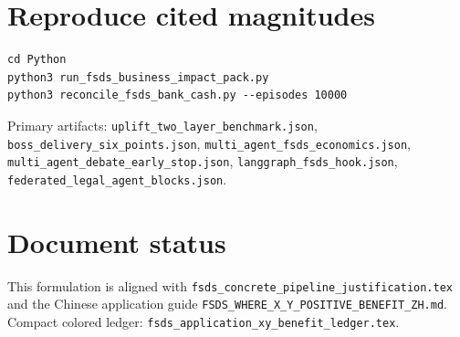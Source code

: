 \documentclass[11pt]{article}
\begin{document}
\section{Reproduce cited magnitudes}
\begin{verbatim}
cd Python
python3 run_fsds_business_impact_pack.py
python3 reconcile_fsds_bank_cash.py --episodes 10000
\end{verbatim}

Primary artifacts:
\texttt{uplift\_two\_layer\_benchmark.json},
\texttt{boss\_delivery\_six\_points.json},
\texttt{multi\_agent\_fsds\_economics.json},
\texttt{multi\_agent\_debate\_early\_stop.json},
\texttt{langgraph\_fsds\_hook.json},
\texttt{federated\_legal\_agent\_blocks.json}.

\section*{Document status}
This formulation is aligned with \texttt{fsds\_concrete\_pipeline\_justification.tex} and the Chinese application guide \texttt{FSDS\_WHERE\_X\_Y\_POSITIVE\_BENEFIT\_ZH.md}.
Compact colored ledger: \texttt{fsds\_application\_xy\_benefit\_ledger.tex}.
\end{document}
